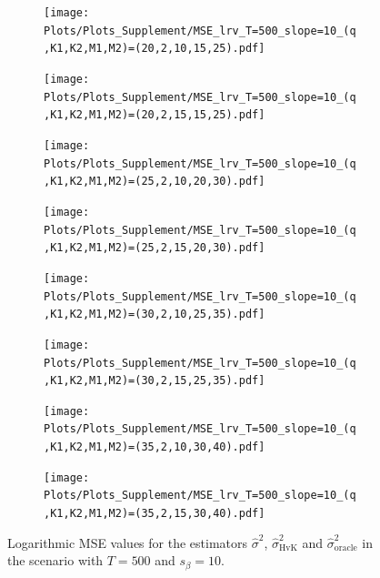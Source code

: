 \begin{figure}[p]
\begin{subfigure}[b]{0.45\textwidth}
\texttt{[image: Plots/Plots\_Supplement/MSE\_lrv\_T=500\_slope=10\_(q,K1,K2,M1,M2)=(20,2,10,15,25).pdf]}
\end{subfigure}
\hspace{0.25cm}
\begin{subfigure}[b]{0.45\textwidth}
\texttt{[image: Plots/Plots\_Supplement/MSE\_lrv\_T=500\_slope=10\_(q,K1,K2,M1,M2)=(20,2,15,15,25).pdf]}
\end{subfigure}

\begin{subfigure}[b]{0.45\textwidth}
\texttt{[image: Plots/Plots\_Supplement/MSE\_lrv\_T=500\_slope=10\_(q,K1,K2,M1,M2)=(25,2,10,20,30).pdf]}
\end{subfigure}
\hspace{0.25cm}
\begin{subfigure}[b]{0.45\textwidth}
\texttt{[image: Plots/Plots\_Supplement/MSE\_lrv\_T=500\_slope=10\_(q,K1,K2,M1,M2)=(25,2,15,20,30).pdf]}
\end{subfigure}

\begin{subfigure}[b]{0.45\textwidth}
\texttt{[image: Plots/Plots\_Supplement/MSE\_lrv\_T=500\_slope=10\_(q,K1,K2,M1,M2)=(30,2,10,25,35).pdf]}
\end{subfigure}
\hspace{0.25cm}
\begin{subfigure}[b]{0.45\textwidth}
\texttt{[image: Plots/Plots\_Supplement/MSE\_lrv\_T=500\_slope=10\_(q,K1,K2,M1,M2)=(30,2,15,25,35).pdf]}
\end{subfigure}

\begin{subfigure}[b]{0.45\textwidth}
\texttt{[image: Plots/Plots\_Supplement/MSE\_lrv\_T=500\_slope=10\_(q,K1,K2,M1,M2)=(35,2,10,30,40).pdf]}
\end{subfigure}
\hspace{0.25cm}
\begin{subfigure}[b]{0.45\textwidth}
\texttt{[image: Plots/Plots\_Supplement/MSE\_lrv\_T=500\_slope=10\_(q,K1,K2,M1,M2)=(35,2,15,30,40).pdf]}
\end{subfigure}
\caption{Logarithmic MSE values for the estimators $\widehat{\sigma}^2$, $\widehat{\sigma}^2_{\text{HvK}}$ and $\widehat{\sigma}^2_{\text{oracle}}$ in the scenario with $T=500$ and $s_\beta=10$.}\label{fig:MSE_slope10_lrv_robust} 
\end{figure}


